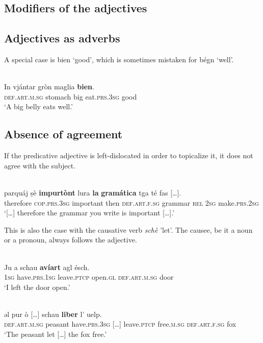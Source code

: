 {\subsection{Modifiers of the adjectives}

\subsection{Adjectives as adverbs}
A special case is bien `good', which is sometimes mistaken for bégn `well'.

\ea\label{}
\\
\gll  In vjántar gròn maglia \textbf{bien}. \\
     \textsc{def.art.m.sg} stomach big eat.\textsc{prs.3sg} good\\
\glt `A big belly eats well.'
\z



\subsection{Absence of agreement}
If the predicative adjective is left-dislocated in order to topicalize it, it does not agree with the subject.

\ea\label{}
\\
\gll    parquáj ṣè \textbf{impurtònt} lura \textbf{la} \textbf{gramática} tga té fas […]. \\
     therefore \textsc{cop.prs.3sg} important then \textsc{def.art.f.sg} grammar \textsc{rel} \textsc{2sg} make.\textsc{prs.2sg}\\
\glt `[…] therefore the grammar you write is important […].'
\z

This is also the case with the causative verb \textit{schè} 'let'. The causee, be it a noun or a pronoun, always follows the adjective.

\ea\label{}
\\
\gll Ju a schau \textbf{avíart} agl ésch.   \\
 \textsc{1sg} have.\textsc{prs.1sg} leave.\textsc{ptcp} open.\textsc{gl} \textsc{def.art.m.sg} door\\
\glt `I left the door open.'
\z

\ea\label{}
\\
\gll    ǝl pur ò […] schau \textbf{liber} l’ uelp.\\
     \textsc{def.art.m.sg} peasant have.\textsc{prs.3sg} […] leave.\textsc{ptcp} free.\textsc{m.sg} \textsc{def.art.f.sg} fox\\
\glt `The peasant let […] the fox free.'
\z

}
